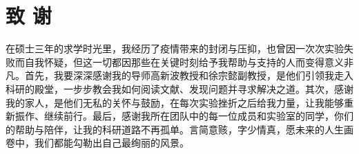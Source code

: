 \chapter{致 \quad 谢}
\thispagestyle{others}
\pagestyle{others}
\xiaosi
在硕士三年的求学时光里，我经历了疫情带来的封闭与压抑，也曾因一次次实验失败而自我怀疑，但这一切都因那些在关键时刻给予我帮助与支持的人而变得意义非凡。首先，我要深深感谢我的导师高新波教授和徐宗懿副教授，是他们引领我走入科研的殿堂，一步步教会我如何阅读文献、发现问题并寻求解决之道。其次，感谢我的家人，是他们无私的关怀与鼓励，在每次实验挫折之后给我力量，让我能够重新振作、继续前行。最后，感谢我所在团队中的每一位成员和实验室的同学，你们的帮助与陪伴，让我的科研道路不再孤单。言简意赅，字少情真，愿未来的人生画卷中，我们都能勾勒出自己最绚丽的风景。
